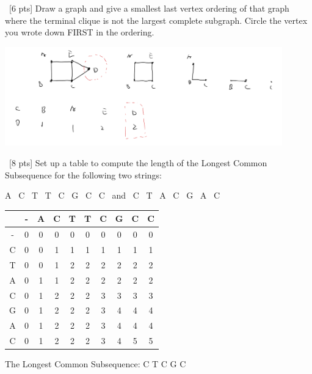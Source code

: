 \documentclass[12pt]{article}
\newenvironment{sol}[1][Solution]{\begin{trivlist}\item[\hskip\labelsep {\bfseries #1:}]}{\end{trivlist}}
\begin{document}
\begin{enumerate}
    \item \ [6 pts] Draw a graph and give a smallest last vertex ordering of that graph where the terminal clique is not the largest complete subgraph. Circle the vertex you wrote down FIRST in the ordering.
    \begin{sol}
    \hspace*{\fill}
                    \begin{center}
        \includegraphics[width=0.9\textwidth]{p4.jpeg}
    \end{center}
    \end{sol}

    \item \ [8 pts] Set up a table to compute the length of the Longest Common Subsequence for the following two strings: 
    \begin{center}
        A  \ C \  T \ T \ C \ G \ C \ C \ and  \ C \ T \ A \ C \ G \ A \ C
    \end{center}

            \begin{sol}
        \hspace*{\fill}
        \begin{center}
            \begin{tabular}{|c|c|c|c|c|c|c|c|c|c|}
            \hline
                  &- & A  & C & T & T & C & G & C & C  \\
                  \hline
                 - &0 & 0  & 0 &0 & 0& 0 & 0& 0 & 0\\
                 \hline
                C & 0 & 0  & 1  & 1  & 1  &1 &1 &1 &1\\
                \hline
                T &  0 & 0  & 1  &2   & 2  & 2 & 2& 2&2\\
                \hline
                A &  0 &  1  & 1  & 2  & 2  &2 &2 &2 &2\\
                \hline
                C &  0 &  1& 2  & 2  & 2  &3 &3 &3 &3\\
                \hline
                G &  0 &  1 & 2  & 2  & 2  &3 &4 &4 &4\\
                \hline
                A &  0 &  1 & 2  & 2  & 2  &3 & 4& 4&4\\
                \hline
                C &  0 &  1 & 2  & 2  & 2  &3 & 4&5 &5\\
                \hline
            \end{tabular}
        \end{center}
        The Longest Common Subsequence: C T C G C
        \end{sol}
        


\end{enumerate}
\end{document}
